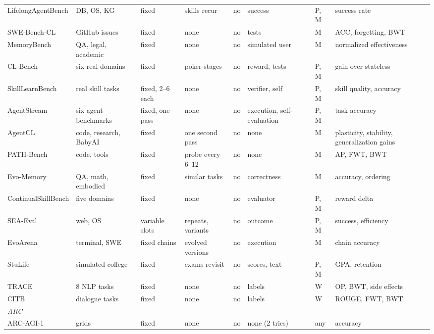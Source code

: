 \begin{table}
\begin{adjustbox}{max width=\textheight}
\begin{tabular}{llllllll}
LifelongAgentBench \citep{zheng2025lifelongagentbench} & DB, OS, KG & fixed & skills recur & no & success & P, M & success rate \\
SWE-Bench-CL \citep{joshi2025swebenchcl} & GitHub issues & fixed & none & no & tests & M & ACC, forgetting, BWT \\
MemoryBench \citep{ai2025memorybench} & QA, legal, academic & fixed & none & no & simulated user & M & normalized effectiveness \\
CL-Bench \citep{asawa2026clbench} & six real domains & fixed & poker stages & no & reward, tests & P, M & gain over stateless \\
SkillLearnBench \citep{zhong2026skilllearnbench} & real skill tasks & fixed, 2--6 each & none & no & verifier, self & P, M & skill quality, accuracy \\
AgentStream \citep{yan2026agentstream} & six agent benchmarks & fixed, one pass & none & no & execution, self-evaluation & P, M & task accuracy \\
AgentCL \citep{shu2026agentcl} & code, research, BabyAI & fixed & one second pass & no & none & M & plasticity, stability, generalization gains \\
PATH-Bench \citep{yang2026pathbench} & code, tools & fixed & probe every 6--12 & no & none & M & AP, FWT, BWT \\
Evo-Memory \citep{wei2025evomemory} & QA, math, embodied & fixed & similar tasks & no & correctness & M & accuracy, ordering \\
ContinualSkillBench \citep{guan2026continualskillbench} & five domains & fixed & none & no & evaluator & P, M & reward delta \\
SEA-Eval \citep{jiang2026seaeval} & web, OS & variable slots & repeats, variants & no & outcome & P, M & success, efficiency \\
EvoArena \citep{xu2026evoarena} & terminal, SWE & fixed chains & evolved versions & no & execution & M & chain accuracy \\
StuLife \citep{cai2025ell} & simulated college & fixed & exams revisit & no & scores, text & P, M & GPA, retention \\
TRACE \citep{wang2023trace} & 8 NLP tasks & fixed & none & no & labels & W & OP, BWT, side effects \\
CITB \citep{zhang2023citb} & dialogue tasks & fixed & none & no & labels & W & ROUGE, FWT, BWT \\
\midrule
\multicolumn{8}{l}{\emph{ARC}} \\
ARC-AGI-1 \citep{chollet2019measure} & grids & fixed & none & no & none (2 tries) & any & accuracy \\

\end{tabular}
\end{adjustbox}
\end{table}
